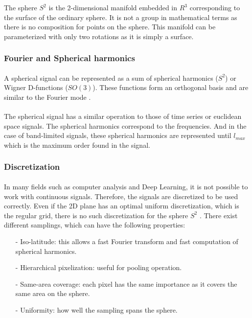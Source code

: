 \documentclass[11pt]{report}
\begin{document}
The sphere $S^2$ is the 2-dimensional manifold embedded in $R^3$ corresponding to the surface of the ordinary sphere. It is not a group in mathematical terms as there is no composition for points on the sphere. This manifold can be parameterized with only two rotations as it is simply a surface.

\subsubsection{Fourier and Spherical harmonics}
\paragraph*{}
A spherical signal can be represented as a sum of spherical harmonics ($S^2$) or Wigner D-functions ($SO(3)$)\cite{cohen_convolutional_2017}. These functions form an orthogonal basis and are similar to the Fourier mode \cite{driscoll_computing_1994}.
        
\paragraph*{}
The spherical signal has a similar operation to those of time series or euclidean space signals. The spherical harmonics correspond to the frequencies. And in the case of band-limited signals, these spherical harmonics are represented until $l_{max}$ which is the maximum order found in the signal. 

\subsubsection{Discretization}\label{sec:sampling}
\paragraph*{}
In many fields such as computer analysis and Deep Learning, it is not possible to work with continuous signals. Therefore, the signals are discretized to be used correctly. Even if the 2D plane has an optimal uniform discretization, which is the regular grid, there is no such discretization for the sphere $S^2$ \cite{perraudin_deepsphere:_2018}\cite{cohen_spherical_2018}\cite{driscoll_computing_1994}.
There exist different samplings, which can have the following properties:
        \begin{itemize}
        \setlength\itemsep{0.1em}
            \item[-] Iso-latitude: this allows a fast Fourier transform and fast computation of spherical harmonics.
            \item[-] Hierarchical pixelization: useful for pooling operation.
            \item[-] Same-area coverage: each pixel has the same importance as it covers the same area on the sphere.
            \item[-] Uniformity: how well the sampling spans the sphere.
        \end{itemize}
        
\end{document}
